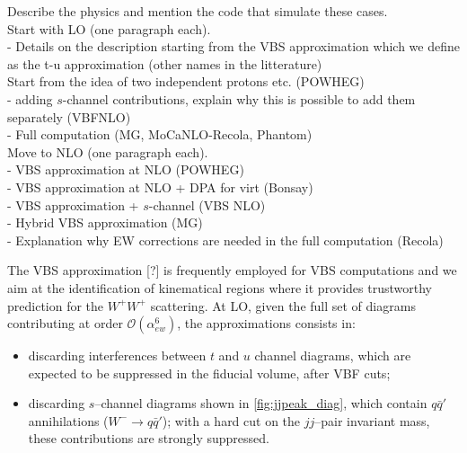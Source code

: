 Describe the physics and mention the code that simulate these cases. \\
Start with LO (one paragraph each). \\

- Details on the description starting from the VBS approximation which we define as the t-u approximation (other names in the litterature) \\
Start from the idea of two independent protons etc. (POWHEG) \\
- adding $s$-channel contributions, explain why this is possible to add them separately (VBFNLO)\\
- Full computation (MG, MoCaNLO-Recola, Phantom) \\

Move to NLO (one paragraph each). \\

- VBS approximation at NLO (POWHEG) \\
- VBS approximation at NLO + DPA for virt (Bonsay) \\
- VBS approximation + $s$-channel (VBS NLO) \\
- Hybrid VBS approximation (MG) \\
- Explanation why EW corrections are needed in the full computation (Recola) \\


The VBS approximation [?] is frequently employed for VBS computations and we aim at the identification of kinematical regions where it provides trustworthy prediction for the $W^+W^+$ scattering.
At LO, given the full set of diagrams contributing at order $\mathcal{O}(\alpha_{ew}^6)$, the approximations consists in:
\begin{itemize}
\item discarding interferences between $t$ and $u$ channel diagrams, which are expected to be suppressed in the fiducial volume, after VBF cuts;
\item discarding $s$--channel diagrams shown in \autoref{fig:jjpeak_diag}, which contain $q\bar{q}'$ annihilations ($W^-\rightarrow q \bar{q}'$); with a hard cut on the $jj$--pair invariant mass, these contributions are strongly suppressed.
\end{itemize}

